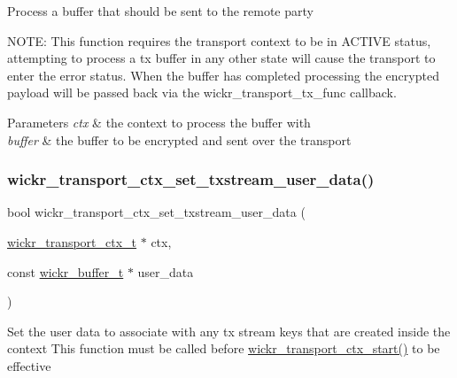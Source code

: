 Process a buffer that should be sent to the remote party

N\+O\+TE\+: This function requires the transport context to be in A\+C\+T\+I\+VE status, attempting to process a tx buffer in any other state will cause the transport to enter the error status. When the buffer has completed processing the encrypted payload will be passed back via the wickr\+\_\+transport\+\_\+tx\+\_\+func callback.


\begin{DoxyParams}{Parameters}
{\em ctx} & the context to process the buffer with \\
\hline
{\em buffer} & the buffer to be encrypted and sent over the transport \\
\hline
\end{DoxyParams}
\mbox{\label{group__wickr__transport__ctx_ga599461036962c38cdb453477288f2b4a}} 
\subsubsection{\texorpdfstring{wickr\+\_\+transport\+\_\+ctx\+\_\+set\+\_\+txstream\+\_\+user\+\_\+data()}{wickr\_transport\_ctx\_set\_txstream\_user\_data()}}
{\footnotesize\ttfamily bool wickr\+\_\+transport\+\_\+ctx\+\_\+set\+\_\+txstream\+\_\+user\+\_\+data (\begin{DoxyParamCaption}\item[{\hyperlink{structwickr__transport__ctx}{wickr\+\_\+transport\+\_\+ctx\+\_\+t} $\ast$}]{ctx,  }\item[{const \hyperlink{structwickr__buffer}{wickr\+\_\+buffer\+\_\+t} $\ast$}]{user\+\_\+data }\end{DoxyParamCaption})}

Set the user data to associate with any tx stream keys that are created inside the context This function must be called before \hyperlink{group__wickr__transport__ctx_gaee74761e31d5f0a6fc97e2ccf5ac1e29}{wickr\+\_\+transport\+\_\+ctx\+\_\+start()} to be effective


